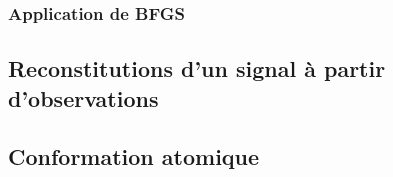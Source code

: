 \documentclass[3p, twocolumn]{elsarticle}
\begin{document}
\subsubsection{Application de BFGS}

\subsection{Reconstitutions d'un signal à partir d'observations}
\subsection{Conformation atomique}
\end{document}
